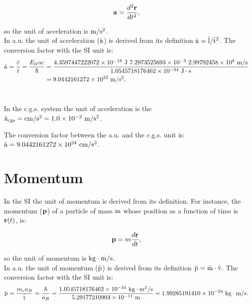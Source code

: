 \documentclass[12pt,a4paper,twoside]{report}
\def\hbarf{1.0545718176462\times 10^{-34}}
\def\cspeed{2.99792458\times 10^{8}}
\def\alphaf{7.2973525693\times 10^{-3}}
\def\barl{5.29177210903\times 10^{-11}}
\def\bara{9.0442161272\times 10^{22}}
\def\barp{1.99285191410\times 10^{-24}}
\def\baru{4.3597447222072\times 10^{-18}}
\def\cmtom{1.0\times 10^{-2}}
\def\baracgs{9.0442161272\times 10^{24}}
\begin{document}
\begin{tcolorbox}
\begin{equation}
{\bf a}={d^2{\bf r} \over dt^2},
\end{equation} 
\end{tcolorbox}

so the unit of acceleration is ${\rm m}/{\rm s}^2$.
\\

{\color{web-blue} In a.u. the unit of acceleration (${\rm \bar a}$) is derived 
from its definition ${\rm \bar a} = {\rm \bar l} / {\rm \bar t}^2$. The conversion factor
with the SI unit is:
\begin{align}
{\rm \bar a} = {\bar v \over \bar t}={E_h \alpha c \over \hbar}&= 
{\baru\ {\rm J}\ \alphaf\ \cspeed\ {\rm m}/{\rm s} \over \hbarf\ {\rm J}\cdot {\rm s}}\nonumber \\
&= \bara\ {\rm m}/{\rm s}^2.
\end{align}
\\
}

{\color{orange} In the c.g.s. system the unit of acceleration is the ${\rm \bar a_{cgs}}={\rm cm}/{\rm s}^2 = \cmtom\ {\rm m}/{\rm s}^2$.
\\
}

{\color{green} The conversion factor between the a.u. and the c.g.s. unit is:
${\rm \bar a}=\baracgs\ {\rm cm}/{\rm s}^2$.
\\
}

\newpage
{\color{coral}\section{Momentum}}
\color{black}
In the SI the unit of momentum is derived from its definition.
For instance, the momentum (${\bf p}$) of a particle of mass ${\rm m}$ whose
position as a function of time is ${\bf r}(t)$, is:

\begin{tcolorbox}
\begin{equation}
{\bf p}=m {d{\bf r} \over dt},
\end{equation} 
\end{tcolorbox}

so the unit of momentum is ${\rm kg}\cdot {\rm m}/{\rm s}$.
\\

{\color{web-blue} In a.u. the unit of momentum (${\rm \bar p}$) is derived 
from its definition ${\rm \bar p} = {\rm \bar m} \cdot {\rm \bar v}$. 
The conversion factor with the SI unit is:
\begin{equation}
{\rm \bar p} = {m_e a_B \over {\rm \bar t}}= {\hbar \over a_B} =
{\hbarf\ {\rm kg}\cdot {\rm m}^2/{\rm s} \over \barl\ {\rm m}}=\barp\ {\rm kg}
\cdot {\rm m}/{\rm s}.
\end{equation}
\\ }
\end{document}
